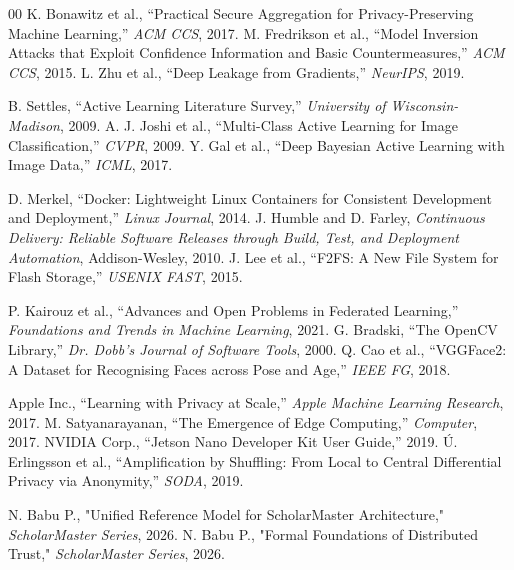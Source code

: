\documentclass[conference]{IEEEtran}
\begin{document}
\begin{thebibliography}{00}
 K. Bonawitz et al., ``Practical Secure Aggregation for Privacy-Preserving Machine Learning,'' \textit{ACM CCS}, 2017.
 M. Fredrikson et al., ``Model Inversion Attacks that Exploit Confidence Information and Basic Countermeasures,'' \textit{ACM CCS}, 2015.
 L. Zhu et al., ``Deep Leakage from Gradients,'' \textit{NeurIPS}, 2019.

 B. Settles, ``Active Learning Literature Survey,'' \textit{University of Wisconsin-Madison}, 2009.
 A. J. Joshi et al., ``Multi-Class Active Learning for Image Classification,'' \textit{CVPR}, 2009.
 Y. Gal et al., ``Deep Bayesian Active Learning with Image Data,'' \textit{ICML}, 2017.

 D. Merkel, ``Docker: Lightweight Linux Containers for Consistent Development and Deployment,'' \textit{Linux Journal}, 2014.
 J. Humble and D. Farley, \textit{Continuous Delivery: Reliable Software Releases through Build, Test, and Deployment Automation}, Addison-Wesley, 2010.
 J. Lee et al., ``F2FS: A New File System for Flash Storage,'' \textit{USENIX FAST}, 2015.

 P. Kairouz et al., ``Advances and Open Problems in Federated Learning,'' \textit{Foundations and Trends in Machine Learning}, 2021.
 G. Bradski, ``The OpenCV Library,'' \textit{Dr. Dobb's Journal of Software Tools}, 2000.
 Q. Cao et al., ``VGGFace2: A Dataset for Recognising Faces across Pose and Age,'' \textit{IEEE FG}, 2018.

 Apple Inc., ``Learning with Privacy at Scale,'' \textit{Apple Machine Learning Research}, 2017.
 M. Satyanarayanan, ``The Emergence of Edge Computing,'' \textit{Computer}, 2017.
 NVIDIA Corp., ``Jetson Nano Developer Kit User Guide,'' 2019.
 Ú. Erlingsson et al., ``Amplification by Shuffling: From Local to Central Differential Privacy via Anonymity,'' \textit{SODA}, 2019.


 N. Babu P., "Unified Reference Model for ScholarMaster Architecture," \textit{ScholarMaster Series}, 2026.
 N. Babu P., "Formal Foundations of Distributed Trust," \textit{ScholarMaster Series}, 2026.
\end{thebibliography}
\end{document}

